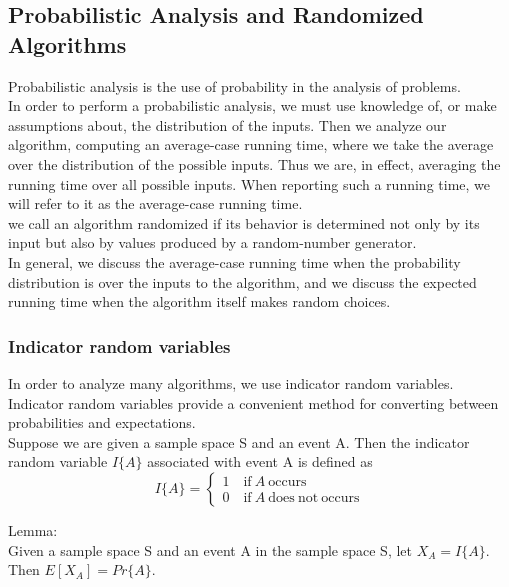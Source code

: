 \documentclass[11pt]{article}
\begin{document}
\subsection{Probabilistic Analysis and Randomized Algorithms}
\label{sec-2-5}


Probabilistic analysis is the use of probability in the analysis of problems. \\

In order to perform a probabilistic analysis, we must use knowledge of, or make assumptions about, the distribution of the inputs. Then we analyze our algorithm, computing an average-case running time, where we take the average over the distribution of the possible inputs. Thus we are, in effect, averaging the running time over all possible inputs. When reporting such a running time, we will refer to it as the average-case running time. \\

we call an algorithm randomized if its behavior is determined not only by its input but also by values produced by a random-number generator. \\

In general, we discuss the average-case running time when the probability distribution is over the inputs to the algorithm, and we discuss the expected running time when the algorithm itself makes random choices. \\

\subsubsection{Indicator random variables}
\label{sec-2-5-1}
In order to analyze many algorithms, we use indicator random variables. Indicator random variables provide a convenient method for converting between probabilities and expectations. \\
Suppose we are given a sample space S and an event A. Then the indicator random variable $I\{A\}$ associated with event A is defined as \\
\begin{equation}
I\{A\}=
\begin{cases}
1 \quad \mathrm{if} \ A \ \mathrm{occurs} \\
0 \quad \mathrm{if} \ A \ \mathrm{does\ not\ occurs}
\end{cases}
\end{equation}

Lemma: \\
Given a sample space S and an event A in the sample space S, let $X_A = I\{A\}$. Then $E[X_A]=Pr\{A\}$. \\
\end{document}
